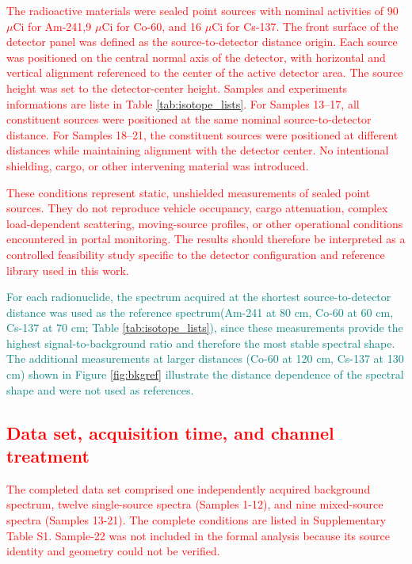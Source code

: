 \documentclass[pdflatex,sn-mathphys-num, table]{sn-jnl}%
\theoremstyle{thmstyleone}%
\theoremstyle{thmstyletwo}%
\theoremstyle{thmstylethree}%
\begin{document}
\textcolor{red}{The radioactive materials were sealed point sources with nominal activities of 90 $\mu\text{Ci}$ for Am-241,9 $\mu\text{Ci}$ for Co-60, and 16 $\mu\text{Ci}$ for Cs-137. The front surface of the detector panel was defined as the source-to-detector distance origin. Each source was positioned on the central normal axis of the detector, with horizontal and vertical  alignment  referenced  to  the  center  of  the  active  detector  area.  The  source  height  was  set  to  the detector-center height. Samples and experiments informations are liste in Table \ref{tab:isotope_lists}. For Samples 13–17, all constituent sources were positioned at the same nominal source-to-detector distance. For  Samples  18–21,  the  constituent  sources  were  positioned  at  different  distances  while  maintaining alignment  with  the  detector  center.  No  intentional  shielding,  cargo,  or  other  intervening  material  was introduced. }

\textcolor{red}{These conditions represent static, unshielded measurements of sealed point sources. They do not reproduce vehicle occupancy, cargo attenuation, complex load-dependent scattering, moving-source profiles, or other operational  conditions  encountered  in  portal  monitoring.  The  results  should  therefore  be  interpreted  as  a controlled feasibility study specific to the detector configuration and reference library used in this work.}


\textcolor{teal}{For each radionuclide, the spectrum acquired at the shortest source-to-detector distance was used as the reference spectrum(Am-241 at 80 cm, Co-60 at 60 cm, Cs-137 at 70 cm; Table \ref{tab:isotope_lists}), since these measurements provide the highest signal-to-background ratio and therefore the most stable spectral shape. The additional measurements at larger distances (Co-60 at 120 cm, Cs-137 at 130 cm) shown in Figure \ref{fig:bkgref} illustrate the distance dependence of the spectral shape and were not used as references.}

\subsection*{\textcolor{red}{Data set, acquisition time, and channel treatment}}

\textcolor{red}{The completed data set comprised one independently acquired background spectrum, twelve single-source spectra (Samples 1-12), and nine mixed-source spectra (Samples 13-21). The complete conditions are listed in Supplementary Table S1. Sample-22 was not included in the formal analysis because its source identity and geometry could not be verified.} 
\end{document}
